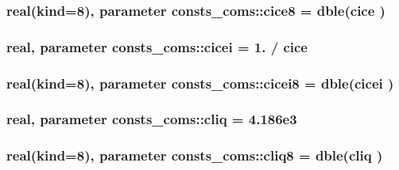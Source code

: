 \subsubsection[{\texorpdfstring{cice8}{cice8}}]{\setlength{\rightskip}{0pt plus 5cm}real(kind=8), parameter consts\+\_\+coms\+::cice8 = dble({\bf cice} )}\hypertarget{namespaceconsts__coms_a668f0c857a96c3f20e06c950a68910c0}{}\label{namespaceconsts__coms_a668f0c857a96c3f20e06c950a68910c0}
\subsubsection[{\texorpdfstring{cicei}{cicei}}]{\setlength{\rightskip}{0pt plus 5cm}real, parameter consts\+\_\+coms\+::cicei = 1. / {\bf cice}}\hypertarget{namespaceconsts__coms_a090b60028f7eece2f3e31fdafb782241}{}\label{namespaceconsts__coms_a090b60028f7eece2f3e31fdafb782241}
\subsubsection[{\texorpdfstring{cicei8}{cicei8}}]{\setlength{\rightskip}{0pt plus 5cm}real(kind=8), parameter consts\+\_\+coms\+::cicei8 = dble({\bf cicei} )}\hypertarget{namespaceconsts__coms_aa60b50b0db15afc52c7ac27b9134ac7e}{}\label{namespaceconsts__coms_aa60b50b0db15afc52c7ac27b9134ac7e}
\subsubsection[{\texorpdfstring{cliq}{cliq}}]{\setlength{\rightskip}{0pt plus 5cm}real, parameter consts\+\_\+coms\+::cliq = 4.\+186e3}\hypertarget{namespaceconsts__coms_a13d31490311637a98d90c0582964525a}{}\label{namespaceconsts__coms_a13d31490311637a98d90c0582964525a}
\subsubsection[{\texorpdfstring{cliq8}{cliq8}}]{\setlength{\rightskip}{0pt plus 5cm}real(kind=8), parameter consts\+\_\+coms\+::cliq8 = dble({\bf cliq} )}\hypertarget{namespaceconsts__coms_a27eaa3711bac5d4a88b120716c62faef}{}\label{namespaceconsts__coms_a27eaa3711bac5d4a88b120716c62faef}
